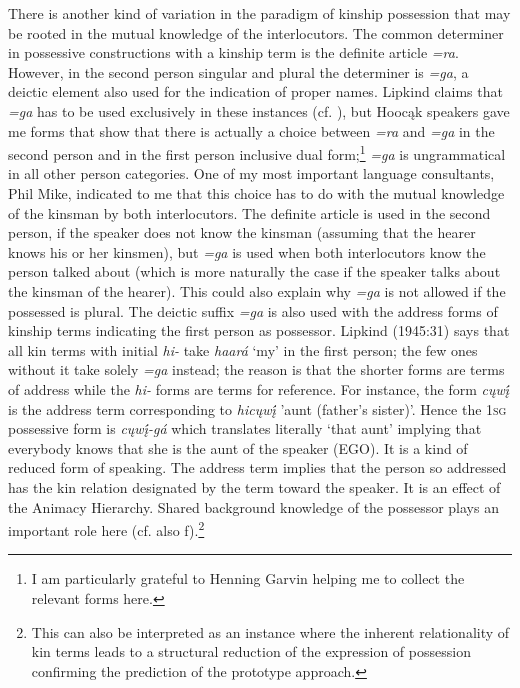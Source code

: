 \documentclass[output=paper]{LSP/langsci}
\begin{document}
There is another kind of variation in the paradigm of kinship possession that may be rooted in the mutual knowledge of the interlocutors. The common determiner in possessive constructions with a kinship term is the definite article \textit{=ra}. However, in the second person singular and plural the determiner is \textit{=ga}, a deictic element also used for the indication of proper names. Lipkind claims that \textit{=ga} has to be used exclusively in these instances (cf. \citealt[31]{Lipkind1945}), but Hoocąk speakers gave me forms that show that there is actually a choice between \textit{=ra} and \textit{=ga} in the second person and in the first person inclusive dual form;\footnote{I am particularly grateful to Henning Garvin helping me to collect the relevant forms here.} \textit{=ga} is ungrammatical in all other person categories. One of my most important language consultants, Phil Mike, indicated to me that this choice has to do with the mutual knowledge of the kinsman by both interlocutors. The definite article is used in the second person, if the speaker does not know the kinsman (assuming that the hearer knows his or her kinsmen), but \textit{=ga} is used when both interlocutors know the person talked about (which is more naturally the case if the speaker talks about the kinsman of the hearer). This could also explain why \textit{=ga} is not allowed if the possessed is plural. The deictic suffix \textit{=ga} is also used with the address forms of kinship terms indicating the first person as possessor. Lipkind (1945:31) says that all kin terms with initial \textit{hi-} take \textit{haará} `my' in the first person; the few ones without it take solely \textit{=ga} instead; the reason is that the shorter forms are terms of address while the \textit{hi-} forms are terms for reference. For instance, the form \textit{cųwį́} is the address term corresponding to \textit{hicųwį́} 'aunt (father's sister)'. Hence the \textsc{1sg} possessive form is \textit{cųwį́-gá} which translates literally `that aunt' implying that everybody knows that she is the aunt of the speaker (EGO). It is a kind of reduced form of speaking. The address term implies that the person so addressed has the kin relation designated by the term toward the speaker. It is an effect of the Animacy Hierarchy. Shared background knowledge of the possessor plays an important role here (cf. also \citealt[26]{Heine1997}f).\footnote{This can also be interpreted as an instance where the inherent relationality of kin terms leads to a structural reduction of the expression of possession confirming the prediction of the prototype approach.}
\end{document}
